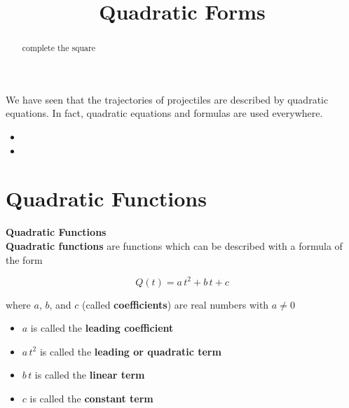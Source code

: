 \documentclass{ximera}
\title{Quadratic Forms}
\begin{document}
\begin{abstract}
complete the square
\end{abstract}
\maketitle



We have seen that the trajectories of projectiles are described by quadratic equations.  In fact, quadratic equations and formulas are used everywhere.


\begin{itemize}
\item {}
\item {}
\end{itemize}







\section{Quadratic Functions}


\begin{definition} \textbf{\textcolor{green!50!black}{Quadratic Functions}} \\
\textbf{Quadratic functions} are functions which can be described with a formula of the form

\[  Q(t) = a \, t^2 + b \, t + c  \]

where $a$, $b$, and $c$ (called \textbf{coefficients}) are real numbers with $a \ne 0$



\begin{itemize}
\item $a$ is called the \textbf{leading coefficient} 
\item $a \, t^2$ is called the \textbf{leading or quadratic term} 
\item $b \, t$ is called the \textbf{linear term} 
\item $c$ is called the \textbf{constant term} 
\end{itemize}

\end{definition}
\end{document}
